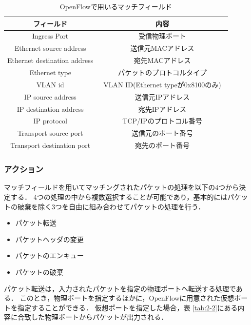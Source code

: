 \begin{table}[tb]
	\begin{center}
		\caption{OpenFlowで用いるマッチフィールド}
		\begin{tabular}{c|c}
			\hline
			フィールド & 内容　\\ \hline \hline
			Ingress Port & 受信物理ポート　\\ \hline
			Ethernet source address & 送信元MACアドレス \\ \hline
			Ethernet destination address & 宛先MACアドレス　\\ \hline
			Ethernet type & パケットのプロトコルタイプ \\ \hline
			VLAN id & VLAN ID(Ethernet typeが0x8100のみ)　\\ \hline
			IP source address & 送信元IPアドレス　\\ \hline
			IP destination address & 宛先IPアドレス　\\ \hline
			IP protocol & TCP/IPのプロトコル番号　\\ \hline
			Transport source port & 送信元のポート番号　\\ \hline
			Transport destination port & 宛先のポート番号\\ \hline
		\end{tabular}
		\label{tab:2-1}
	\end{center}
\end{table}

\subsubsection{アクション}

マッチフィールドを用いてマッチングされたパケットの処理を以下の4つから決定する\cite{openflowjapanese}．
4つの処理の中から複数選択することが可能であり，基本的にはパケットの破棄を除く3つを自由に組み合わせてパケットの処理を行う．

\begin{itemize}
	\item パケット転送
	\item パケットヘッダの変更
	\item パケットのエンキュー
	\item パケットの破棄
\end{itemize}

パケット転送は，入力されたパケットを指定の物理ポートへ転送する処理である．
このとき，物理ポートを指定するほかに，OpenFlowに用意された仮想ポートを指定することができる．
仮想ポートを指定した場合，表 \ref{tab:2-2}にある内容に合致した物理ポートからパケットが出力される．

